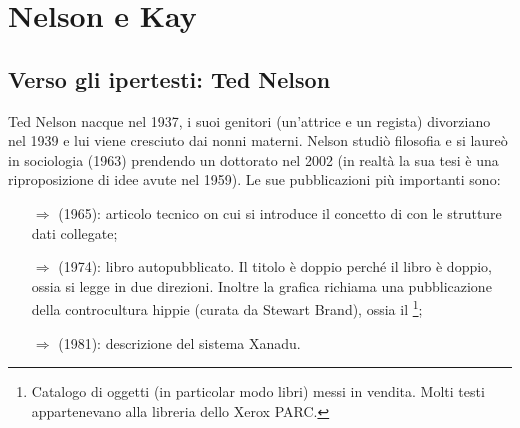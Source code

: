 \chapter{Nelson e Kay}

\section{Verso gli ipertesti: Ted Nelson}

Ted Nelson nacque nel 1937, i suoi genitori (un'attrice e un regista) divorziano nel 1939 e lui viene cresciuto dai nonni
materni. Nelson studiò filosofia e si laureò in sociologia (1963) prendendo un dottorato nel 
2002 (in realtà la sua tesi è una riproposizione di idee avute nel 1959).
Le sue pubblicazioni più importanti sono:

\begin{itemize}
    \item [$\Rightarrow$]  (1965): 
    articolo tecnico on cui si introduce il concetto di  con le strutture dati collegate;
    \item [$\Rightarrow$]  (1974): libro autopubblicato.
    Il titolo è doppio perché il libro è doppio, ossia si legge in due direzioni.
    Inoltre la grafica richiama una pubblicazione della controcultura hippie (curata da Stewart Brand),
    ossia il \footnote{Catalogo di oggetti (in particolar modo libri)
    messi in vendita. Molti testi appartenevano alla libreria dello Xerox PARC.};
    \item [$\Rightarrow$]  (1981): descrizione del sistema Xanadu.
\end{itemize}



